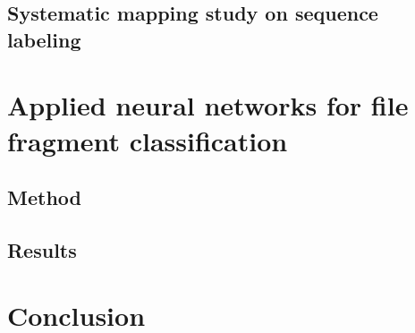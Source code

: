     \section{Systematic mapping study on sequence labeling}
    

\chapter{Applied neural networks for file fragment classification}


\section{Method}


\section{Results}


\chapter{Conclusion}

